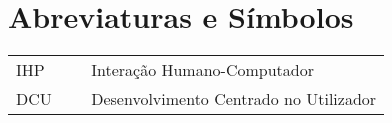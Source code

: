\chapter*{Abreviaturas e Símbolos}

\begin{flushleft}
\begin{tabular}{l p{0.8\linewidth}}
IHP     & Interação Humano-Computador\\
DCU     & Desenvolvimento Centrado no Utilizador\\
\end{tabular}
\end{flushleft}

